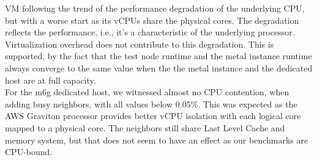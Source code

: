 VM following the trend of the performance degradation of the underlying CPU, but with a worse start 
as its vCPUs share the physical cores.  
The degradation reflects the performance, i.e., it's a characteristic of the 
underlying processor. Virtualization overhead does not contribute to this degradation. 
This is supported, by the fact that  the test node runtime and the metal instance runtime always 
converge to the same value when the the metal instance and the dedicated host are at full capacity. \\
For the m6g dedicated host, we witnessed almost no CPU contention, when adding busy neighbors, with 
all values below 0.05\%. This was expected as the AWS Graviton processor provides better vCPU 
isolation with each logical core mapped to a physical core. The neighbors still share 
Last Level Cache and memory system, but that does not seem to have an effect as our benchmarks are 
CPU-bound. 
